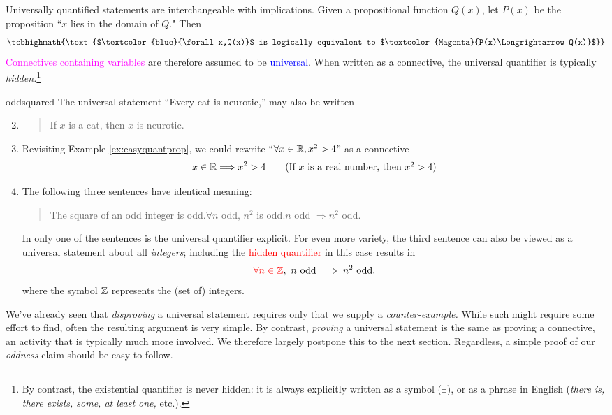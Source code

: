 \label{pg:univproof}

Universally quantified statements are interchangeable with implications. Given a propositional function $Q(x)$, let $P(x)$ be the proposition ``$x$ lies in the domain of $Q$." Then
\[
	\tcbhighmath{\text{$\textcolor{blue}{\forall x,Q(x)}$ is logically equivalent to $\textcolor{Magenta}{P(x)\Longrightarrow Q(x)}$}}
\]
\textcolor{Magenta}{Connectives containing variables} are therefore assumed to be \textcolor{blue}{universal}. When written as a connective, the universal quantifier is typically \emph{hidden.}\footnote{By contrast, the existential quantifier is never hidden: it is always explicitly written as a symbol ($\exists$), or as a phrase in English (\emph{there is, there exists, some, at least one,} etc.).}

\begin{examples}{}{oddsquared}
	\exstart The universal statement ``Every cat is neurotic,'' may also be written
	\begin{enumerate}\setcounter{enumi}{1}
	  \item[]\begin{quote}
			If $x$ is a cat, then $x$ is neurotic.
		\end{quote} 
		
		\item Revisiting Example \ref{ex:easyquantprop}, we could rewrite ``$\forall x\in\mathbb{R}, x^2>4$'' as a connective
		\[
			x\in\mathbb{R}\Longrightarrow x^2>4 \tag{If $x$ is a real number, then $x^2>4$}
		\]
		
	  \item\label{ex:oddsquared2} The following three sentences have identical meaning:
	  \begin{quote}
	  	The square of an odd integer is odd.\qquad $\forall n$ odd, $n^2$ is odd.\qquad $n$ odd $\Longrightarrow n^2$ odd.
	  \end{quote}
	  In only one of the sentences is the universal quantifier explicit. For even more variety, the third sentence can also be viewed as a universal statement about all \emph{integers}; including the \textcolor{red}{hidden quantifier} in this case results in
		\[
			\textcolor{red}{\forall n\in\mathbb{Z}},\ n\text{ odd} \implies n^2 \text{ odd.}
		\]
		where the symbol $\mathbb{Z}$ represents the (set of) integers.
	\end{enumerate}
\end{examples}

We've already seen that \emph{disproving} a universal statement requires only that we supply a \emph{counter-example.} While such might require some effort to find, often the resulting argument is very simple. By contrast, \emph{proving} a universal statement is the same as proving a connective, an activity that is typically much more involved. We therefore largely postpone this to the next section. Regardless, a simple proof of our \emph{oddness} claim should be easy to follow.

